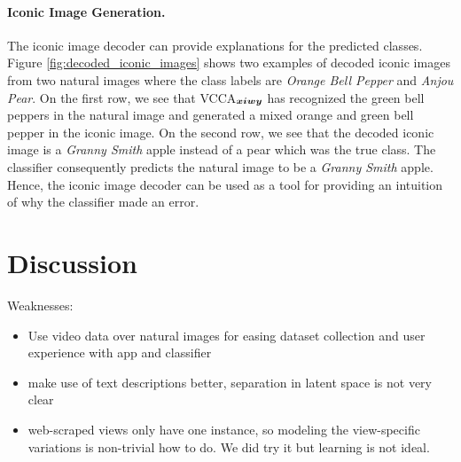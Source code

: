 \paragraph{Iconic Image Generation.} The iconic image decoder can provide explanations for the predicted classes. Figure \ref{fig:decoded_iconic_images} shows two examples of decoded iconic images from two natural images where the class labels are \textit{Orange Bell Pepper} and \textit{Anjou Pear}. On the first row, we see that VCCA$_{{\bm{x}} {\bm{i}} {\bm{w}} {\bm{y}}}$ has recognized the green bell peppers in the natural image and generated a mixed orange and green bell pepper in the iconic image. On the second row, we see that the decoded iconic image is a \textit{Granny Smith} apple instead of a pear which was the true class. The classifier consequently predicts the natural image to be a \textit{Granny Smith} apple. Hence, the iconic image decoder can be used as a tool for providing an intuition of why the classifier made an error. 




\section{Discussion}

Weaknesses:
\begin{itemize}[noitemsep,topsep=0pt]
	\item Use video data over natural images for easing dataset collection and user experience with app and classifier
	\item make use of text descriptions better, separation in latent space is not very clear
	\item web-scraped views only have one instance, so modeling the view-specific variations is non-trivial how to do. We did try it but learning is not ideal.
\end{itemize}




